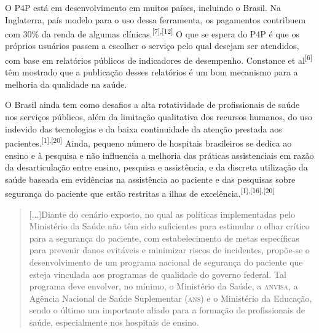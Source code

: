 \documentclass{article}
\begin{document}
O P4P está em desenvolvimento em muitos países, incluindo o Brasil. Na
Inglaterra, país
modelo para o uso dessa ferramenta, os pagamentos contribuem com 30\% da renda
de algumas
clínicas.\textsuperscript{[}\textsuperscript{7}\textsuperscript{]}\textsuperscript{,}\textsuperscript{[}\textsuperscript{12}\textsuperscript{]}
O que se espera do P4P é que os próprios usuários passem a escolher o serviço
pelo
qual desejam ser atendidos, com base em relatórios públicos de indicadores de
desempenho.
Constance et al\textsuperscript{[}\textsuperscript{6}\textsuperscript{]}
têm mostrado que a publicação desses relatórios é um bom mecanismo para a
melhoria
da qualidade na saúde.

O Brasil ainda tem como desafios a alta rotatividade de profissionais de saúde
nos serviços
públicos, além da limitação qualitativa dos recursos humanos, do uso indevido
das
tecnologias e da baixa continuidade da atenção prestada aos pacientes.\textsuperscript{[}\textsuperscript{1}\textsuperscript{]}\textsuperscript{,}\textsuperscript{[}\textsuperscript{20}\textsuperscript{]}
Ainda, pequeno número de hospitais brasileiros se dedica ao ensino e à pesquisa
e
não influencia a melhoria das práticas assistenciais em razão da desarticulação
entre
ensino, pesquisa e assistência, e da discreta utilização da saúde baseada em
evidências na
assistência ao paciente e das pesquisas sobre segurança do paciente que estão
restritas a
ilhas de excelência.\textsuperscript{[}\textsuperscript{1}\textsuperscript{]}\textsuperscript{,}\textsuperscript{[}\textsuperscript{16}\textsuperscript{]}\textsuperscript{,}\textsuperscript{[}\textsuperscript{20}\textsuperscript{]}

\begin{quote}

[...]Diante do cenário exposto, no qual as políticas implementadas pelo
Ministério da Saúde não
têm sido suficientes para estimular o olhar crítico para a segurança do
paciente, com
estabelecimento de metas específicas para prevenir danos evitáveis e minimizar
riscos de
incidentes, propõe-se o desenvolvimento de um programa nacional de segurança do
paciente que
esteja vinculada aos programas de qualidade do governo federal. Tal programa
deve envolver,
no mínimo, o Ministério da Saúde, a \textsc{anvisa}, a Agência Nacional de Saúde
Suplementar (\textsc{ans}) e
o Ministério da Educação, sendo o último um importante aliado para a formação de
profissionais de saúde, especialmente nos hospitais de ensino.

\end{quote}
\end{document}
